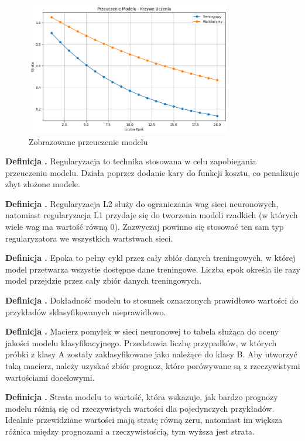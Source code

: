 \begin{figure}[ht]
	\centering
	\includegraphics[width=9cm]{resources/machine-learning/images/def_overfit.png}
	\caption{Zobrazowane przeuczenie modelu}
    \label{Fig:def-2}
\end{figure}
\FloatBarrier

\noindent
\textbf{Definicja .}
\incrementdefinitionIndex
Regularyzacja to technika stosowana w celu zapobiegania przeuczeniu modelu.
Działa poprzez dodanie kary do funkcji kosztu, co penalizuje zbyt złożone modele.

\noindent
\textbf{Definicja .}
\incrementdefinitionIndex
Regularyzacja L2 służy do ograniczania wag sieci neuronowych,
natomiast regularyzacja L1 przydaje się do tworzenia modeli rzadkich (w których wiele wag ma wartość równą 0). 
Zazwyczaj powinno się stosować ten sam typ regularyzatora we wszystkich wartstwach sieci.

\noindent
\textbf{Definicja .}
\incrementdefinitionIndex
Epoka to pełny cykl przez cały zbiór danych treningowych, w której model przetwarza wszystie dostępne dane treningowe.
Liczba epok określa ile razy model przejdzie przez cały zbiór danych treningowych.

\noindent
\textbf{Definicja .}
\incrementdefinitionIndex
Dokładność modelu to stosunek oznaczonych prawidłowo wartości do przykładów sklasyfikowanych nieprawidłowo.

\noindent
\textbf{Definicja .}
\incrementdefinitionIndex
Macierz pomyłek w sieci neuronowej to tabela służąca do oceny jakości modelu klasyfikacyjnego.
Przedstawia liczbę przypadków, w których próbki z klasy A zostały zaklasyfikowane jako należące do klasy B.
Aby utworzyć taką macierz, należy uzyskać zbiór prognoz, które porówywane są z rzeczywistymi wartościami docelowymi.

\noindent
\textbf{Definicja .}
\incrementdefinitionIndex
Strata modelu to wartość, która wskazuje,
jak bardzo prognozy modelu różnią się od rzeczywistych wartości dla pojedynczych przykładów.
Idealnie przewidziane wartości mają stratę równą zeru,
natomiast im większa różnica między prognozami a rzeczywistością, tym wyższa jest strata.

